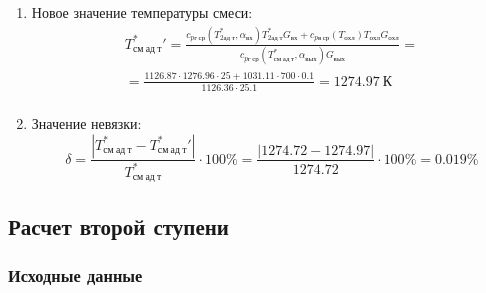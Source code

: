 \documentclass[a4paper,10pt]{article}
\begin{document}
\begin{enumerate}
\begin{enumerate}
            \item Новое значение температуры смеси:
            \begin{gather*}
                T_{см\ ад\ т}^*\prime = \frac{
                        c_{pг\ ср} (T_{2ад\ т}^*, \alpha_{вх}) T_{2ад\ т}^* G_{вх} + c_{pв\ ср} (T_{охл}) T_{охл} G_{охл}
                    }{
                        c_{pг\ ср} (T_{см\ ад\ т}^{*}, \alpha_{вых}) G_{вых}
                    } =\\
                = \frac{
                    1126.87
                    \cdot 1276.96 \cdot 25 +
                    1031.11
                    \cdot 700 \cdot 0.1
                }{
                    1126.36
                    \cdot  25.1
                } =
                1274.97\ К\\
            \end{gather*}

            \item Значение невязки:
            \[
                \delta = \frac{ \left| T_{см\ ад\ т}^{*} - T_{см\ ад\ т}^*\prime \right| }{T_{см\ ад\ т}^{*}} \cdot 100 \% =
                    \frac{
                        \left| 1274.72 - 1274.97 \right|
                    }{
                        1274.72
                    } \cdot 100 \% =
                0.019 \%
            \]
        \end{enumerate}

        

    \end{enumerate}
    

    \subsection{Расчет второй ступени}

    \subsubsection{Исходные данные}
\end{document}
